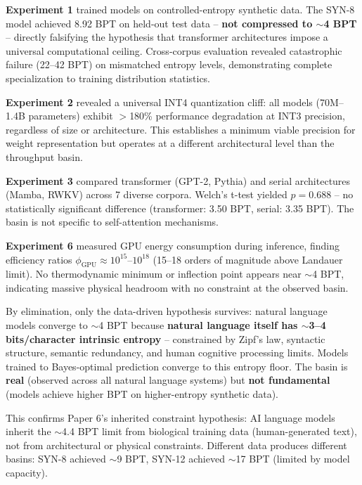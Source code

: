 \documentclass[11pt,a4paper]{article}
\begin{document}
\textbf{Experiment 1} trained models on controlled-entropy synthetic data. The SYN-8 model achieved 8.92 BPT on held-out test data -- \textbf{not compressed to $\sim$4 BPT} -- directly falsifying the hypothesis that transformer architectures impose a universal computational ceiling. Cross-corpus evaluation revealed catastrophic failure (22--42 BPT) on mismatched entropy levels, demonstrating complete specialization to training distribution statistics.

\textbf{Experiment 2} revealed a universal INT4 quantization cliff: all models (70M--1.4B parameters) exhibit $>$180\% performance degradation at INT3 precision, regardless of size or architecture. This establishes a minimum viable precision for weight representation but operates at a different architectural level than the throughput basin.

\textbf{Experiment 3} compared transformer (GPT-2, Pythia) and serial architectures (Mamba, RWKV) across 7 diverse corpora. Welch's t-test yielded $p = 0.688$ -- no statistically significant difference (transformer: 3.50 BPT, serial: 3.35 BPT). The basin is not specific to self-attention mechanisms.

\textbf{Experiment 6} measured GPU energy consumption during inference, finding efficiency ratios $\phi_{\text{GPU}} \approx 10^{15}$--$10^{18}$ (15--18 orders of magnitude above Landauer limit). No thermodynamic minimum or inflection point appears near $\sim$4 BPT, indicating massive physical headroom with no constraint at the observed basin.

By elimination, only the data-driven hypothesis survives: natural language models converge to $\sim$4 BPT because \textbf{natural language itself has $\sim$3--4 bits/character intrinsic entropy} -- constrained by Zipf's law, syntactic structure, semantic redundancy, and human cognitive processing limits. Models trained to Bayes-optimal prediction converge to this entropy floor. The basin is \textbf{real} (observed across all natural language systems) but \textbf{not fundamental} (models achieve higher BPT on higher-entropy synthetic data).

This confirms Paper 6's inherited constraint hypothesis: AI language models inherit the $\sim$4.4 BPT limit from biological training data (human-generated text), not from architectural or physical constraints. Different data produces different basins: SYN-8 achieved $\sim$9 BPT, SYN-12 achieved $\sim$17 BPT (limited by model capacity).
\end{document}
